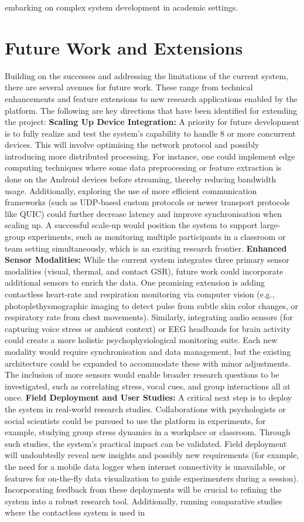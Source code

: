 \documentclass[11pt,a4paper]{report}
\begin{document}
{embarking on complex system development in academic settings. \section{Future Work and Extensions}
Building on the successes and addressing the limitations of the current system, there are several avenues for future work. These range from technical enhancements and feature extensions to new research applications enabled by the platform. The following are key directions that have been identified for extending the project: \textbf{Scaling Up Device Integration:} A priority for future development is to fully realize and test the system’s capability to handle 8 or more concurrent devices. This will involve optimising the network protocol and possibly introducing more distributed processing. For instance, one could implement edge computing techniques where some data preprocessing or feature extraction is done on the Android devices before streaming, thereby reducing bandwidth usage. Additionally, exploring the use of more efficient communication frameworks (such as UDP-based custom protocols or newer transport protocols like QUIC) could further decrease latency and improve synchronisation when scaling up. A successful scale-up would position the system to support large-group experiments, such as monitoring multiple participants in a classroom or team setting simultaneously, which is an exciting research frontier. \textbf{Enhanced Sensor Modalities:} While the current system integrates three primary sensor modalities (visual, thermal, and contact GSR), future work could incorporate additional sensors to enrich the data. One promising extension is adding contactless heart-rate and respiration monitoring via computer vision (e.g., photoplethysmographic imaging to detect pulse from subtle skin color changes, or respiratory rate from chest movements). Similarly, integrating audio sensors (for capturing voice stress or ambient context) or EEG headbands for brain activity could create a more holistic psychophysiological monitoring suite. Each new modality would require synchronisation and data management, but the existing architecture could be expanded to accommodate these with minor adjustments. The inclusion of more sensors would enable broader research questions to be investigated, such as correlating stress, vocal cues, and group interactions all at once. \textbf{Field Deployment and User Studies:} A critical next step is to deploy the system in real-world research studies. Collaborations with psychologists or social scientists could be pursued to use the platform in experiments, for example, studying group stress dynamics in a workplace or classroom. Through such studies, the system’s practical impact can be validated. Field deployment will undoubtedly reveal new insights and possibly new requirements (for example, the need for a mobile data logger when internet connectivity is unavailable, or features for on-the-fly data visualization to guide experimenters during a session). Incorporating feedback from these deployments will be crucial to refining the system into a robust research tool. Additionally, running comparative studies where the contactless system is used in }
\end{document}
